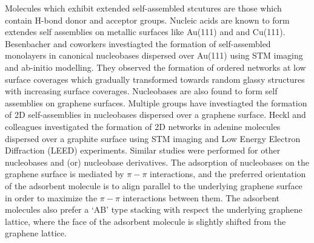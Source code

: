 Molecules which exhibit extended self-assembled stcutures are those which contain H-bond donor and acceptor groups. Nucleic acids are known to form extendes self assemblies on metallic surfaces like Au(111) and and Cu(111).\supercite{kelly_understanding_2008,lukas_adenine_2009,tsud_adenine_2015,otero_guanine_2005,otero_elementary_2008} Besenbacher and coworkers investiagted the formation of self-assembled monolayers in canonical nucleobases dispersed over Au(111) using STM imaging and ab-initio modelling.\supercite{kelly_understanding_2008,lukas_adenine_2009,otero_guanine_2005,otero_elementary_2008} They observed the formation of ordered networks at low surface coverages which gradually transformed towards random glassy structures with increasing surface coverages.\supercite{otero_elementary_2008}  Nucleobases are also found to form self assemblies on graphene surfaces. Multiple groups have investiagted the formation of 2D self-assemblies in nucleobases dispersed over a graphene surface.\supercite{heckl_two-dimensional_1991,freund_structure_1997,xu_coadsorption_2006,akinwande_large-area_2015,spada_guanosine-based_2008,mamdouh_supramolecular_2006} Heckl and colleagues investigated the formation of 2D networks in adenine molecules dispersed over a graphite surface using STM imaging and Low Energy Electron Diffraction (LEED) experiments.\supercite{heckl_two-dimensional_1991} Similar studies were performed for other nucleobases and (or) nucleobase derivatives.\supercite{freund_structure_1997,xu_coadsorption_2006,mamdouh_self-assembly_2009,wang_controlling_2014,mu_temperature-dependent_2013} The adsorption of nucleobases on the graphene surface is mediated by $\pi-\pi$ interactions, and the preferred orientation of the adsorbent molecule is to align parallel to the underlying graphene surface in order to maximize the $\pi-\pi$ interactions between them. The adsorbent molecules also prefer a ‘AB’ type stacking with respect the underlying graphene lattice, where the face of the adsorbent molecule is slightly shifted from the graphene lattice.

